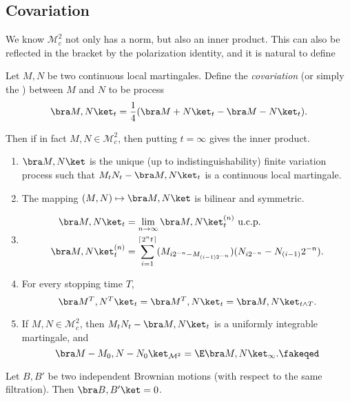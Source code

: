\documentclass[a4paper]{article}
\begin{document}
\subsection{Covariation}
We know $\mathcal{M}_c^2$ not only has a norm, but also an inner product. This can also be reflected in the bracket by the polarization identity, and it is natural to define

\begin{defi}[Covariation]
  Let $M, N$ be two continuous local martingales. Define the \emph{covariation} (or simply the ) between $M$ and $N$ to be process
  \[
    \bra M, N\ket_t = \frac{1}{4} (\bra M + N\ket_t - \bra M -N\ket_t).
  \]
\end{defi}
Then if in fact $M, N \in \mathcal{M}_c^2$, then putting $t = \infty$ gives the inner product.

\begin{prop}\leavevmode
  \begin{enumerate}
    \item $\bra M, N\ket$ is the unique (up to indistinguishability) finite variation process such that $M_t N_t - \bra M, N\ket_t$ is a continuous local martingale.
    \item The mapping $(M, N) \mapsto \bra M, N\ket$ is bilinear and symmetric.
    \item
      \begin{align*}
        \bra M, N\ket_t &= \lim_{n \to \infty} \bra M, N\ket_t^{(n)}\text{ u.c.p.}\\
        \bra M, N\ket^{(n)}_t &= \sum_{i = 1}^{\lceil 2^n t\rceil} (M_{i2^{-n} - M_{(i - 1)2^{-n}}})(N_{i2^{-n}} - N_{(i - 1)} 2^{-n}).
      \end{align*}
    \item For every stopping time $T$,
      \[
        \bra M^T, N^T\ket_t = \bra M^T, N\ket_t = \bra M, N\ket_{t \wedge T}.
      \]
    \item If $M, N \in \mathcal{M}_c^2$, then $M_t N_t - \bra M, N\ket_t$ is a uniformly integrable martingale, and
      \[
        \bra M - M_0, N - N_0\ket_{\mathcal{M}^2} = \E \bra M, N\ket_\infty.\fakeqed
      \]
  \end{enumerate}
\end{prop}

\begin{eg}
  Let $B, B'$ be two independent Brownian motions (with respect to the same filtration). Then $\bra B, B'\ket = 0$.
\end{eg}
\end{document}
